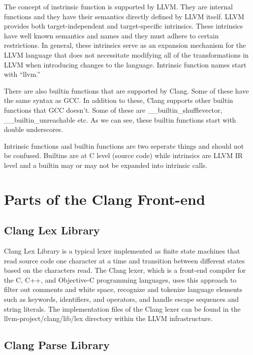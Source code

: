 The concept of instrinsic function is supported by LLVM. They are internal functions and they have their semantics directly defined by LLVM itself. LLVM provides both target-independent and target-specific intrinsics. \cite{llvmdevmeeting} These intrinsics have well known semantics and names and they must adhere to certain restrictions. In general, these intrinsics serve as an expansion mechanism for the LLVM language that does not necessitate modifying all of the transformations in LLVM when introducing changes to the language. Intrinsic function names start with “llvm.” \cite{googlesiteintrinsic}

There are also builtin functions that are supported by Clang. Some of these have the same syntax as GCC. In addition to these, Clang supports other builtin functions that GCC doesn’t. Some of these are \_\_builtin\_shufflevector, \_\_builtin\_unreachable etc. As we can see, these builtin functions start with double underscores.

Intrinsic functions and builtin functions are two seperate things and should not be confused. Builtins are at C level (source code) while intrinsics are LLVM IR level and a builtin may or may not be expanded into intrinsic calls.

\section{Parts of the Clang Front-end}

\subsection{Clang Lex Library}
Clang Lex Library is a typical lexer implemented as finite state machines that read source code one character at a time and transition between different states based on the characters read. The Clang lexer, which is a front-end compiler for the C, C++, and Objective-C programming languages, uses this approach to filter out comments and white space, recognize and tokenize language elements such as keywords, identifiers, and operators, and handle escape sequences and string literals. The implementation files of the Clang lexer can be found in the llvm-project/clang/lib/lex directory within the LLVM infrastructure.
	

\subsection{Clang Parse Library}


